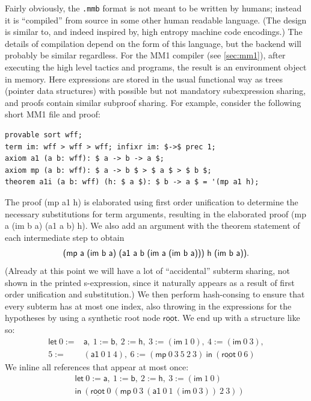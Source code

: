 \documentclass[runningheads]{llncs}
\begin{document}
Fairly obviously, the \texttt{.mmb} format is not meant to be written by humans; instead it is ``compiled'' from source in some other human readable language. (The design is similar to, and indeed inspired by, high entropy machine code encodings.) The details of compilation depend on the form of this language, but the backend will probably be similar regardless. For the \textsf{MM1} compiler (see \autoref{sec:mm1}), after executing the high level tactics and programs, the result is an environment object in memory. Here expressions are stored in the usual functional way as trees (pointer data structures) with possible but not mandatory subexpression sharing, and proofs contain similar subproof sharing. For example, consider the following short \textsf{MM1} file and proof:
\begin{verbatim}
provable sort wff;
term im: wff > wff > wff; infixr im: $->$ prec 1;
axiom a1 (a b: wff): $ a -> b -> a $;
axiom mp (a b: wff): $ a -> b $ > $ a $ > $ b $;
theorem a1i (a b: wff) (h: $ a $): $ b -> a $ = '(mp a1 h);
\end{verbatim}
The proof \textsf{(mp a1 h)} is elaborated using first order unification to determine the necessary substitutions for term arguments, resulting in the elaborated proof \textsf{(mp a (im b a) (a1 a b) h)}. We also add an argument with the theorem statement of each intermediate step to obtain
$$\mbox{\textsf{(mp a (im b a) (a1 a b (im a (im b a))) h (im b a))}}.$$
(Already at this point we will have a lot of ``accidental'' subterm sharing, not shown in the printed s-expression, since it naturally appears as a result of first order unification and substitution.) We then perform hash-consing to ensure that every subterm has at most one index, also throwing in the expressions for the hypotheses by using a synthetic root node $\underline{\textsf{root}}$. We end up with a structure like so:
\begin{align*}
  \mathsf{let}\ 0:={}&\textsf{a},\ 1:=\textsf{b},\ 2:=\textsf{h},\ 3:=(\textsf{im}\ 1\ 0),\ 4:=(\textsf{im}\ 0\ 3),\\
  5:={}&(\textsf{a1}\ 0\ 1\ 4),\ 6:=(\textsf{mp}\ 0\ 3\ 5\ 2\ 3)\ \mathsf{in}\ (\underline{\textsf{root}}\ 0\ 6)
\end{align*}
We inline all references that appear at most once:
\begin{align*}
  &\mathsf{let}\ 0:=\textsf{a},\ 1:=\textsf{b},\ 2:=\textsf{h},\ 3:=(\textsf{im}\ 1\ 0)\\
  &\mathsf{in}\ (\underline{\textsf{root}}\ 0\ (\textsf{mp}\ 0\ 3\ (\textsf{a1}\ 0\ 1\ (\textsf{im}\ 0\ 3))\ 2\ 3))
\end{align*}
\end{document}
